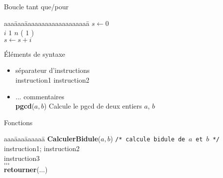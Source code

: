  \begin{frame}{Boucle tant que/pour}
   \begin{tabbing}
     aaa\=aaa\=aaaaaaaaaaaaaaaaaaa\=\kill
     $s \leftarrow 0$ \\
     {} $\mathit{i}$ 
     {} $\mathit{1}$ 
     {} $\mathit{n}$ ( $1$ ) \\
     \> $ s \leftarrow s  +  i$ \\
     {}
   \end{tabbing}
\end{frame}
\begin{frame}{Éléments de syntaxe}
  \begin{itemize}
  \item \red{\textbf{;}} séparateur d'instructions \\
    instruction1 \red{\textbf{;}} instruction2
  \item \red{\textbf{\texttt{/*}}} ... \red{\textbf{\texttt{*/}}}
    commentaires \\
    \textbf{pgcd}($a,b$) \red{\textbf{\texttt{/*}}} Calcule le pgcd
    de deux entiers $a$, $b$ \red{\textbf{\texttt{*/}}}
  \end{itemize}
\end{frame}

\begin{frame}{Fonctions}
  \begin{tabbing}
    aaa\=aaa\=aaaaaa\=\kill
    \textbf{CalculerBidule}($a,b$) \texttt{/* calcule bidule de $a$
      et $b$ */} \\
  \> instruction1; instruction2 \\
  \> instruction3 \\
  \> $\ldots$ \\
  \> $\ldots$ \\
  \> \textbf{retourner}($\ldots$)
  \end{tabbing}
\end{frame}

